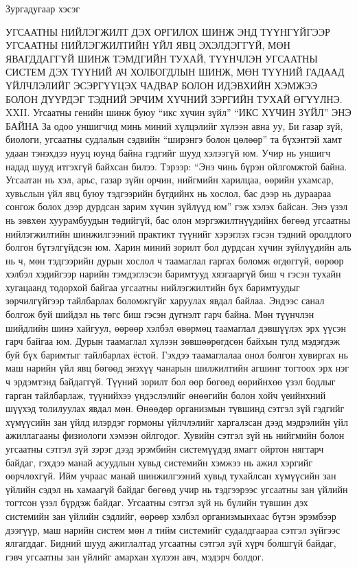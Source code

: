 Зургадугаар хэсэг

УГСААТНЫ НИЙЛЭГЖИЛТ ДЭХ ОРГИЛОХ ШИНЖ
ЭНД ТҮҮНГҮЙГЭЭР УГСААТНЫ НИЙЛЭГЖИЛТИЙН ҮЙЛ ЯВЦ ЭХЭЛДЭГГҮЙ, МӨН ЯВАГДДАГГҮЙ ШИНЖ ТЭМДГИЙН ТУХАЙ, ТҮҮНЧЛЭН УГСААТНЫ СИСТЕМ ДЭХ ТҮҮНИЙ АЧ ХОЛБОГДЛЫН ШИНЖ, МӨН ТҮҮНИЙ ГАДААД ҮЙЛЧЛЭЛИЙГ ЭСЭРГҮҮЦЭХ ЧАДВАР БОЛОН ИДЭВХИЙН ХЭМЖЭЭ БОЛОН ДҮҮРДЭГ ТЭДНИЙ ЭРЧИМ ХҮЧНИЙ ЗЭРГИЙН ТУХАЙ ӨГҮҮЛНЭ.
XXII. Угсаатны генийн шинж буюу “икс хүчин зүйл”
“ИКС ХҮЧИН ЗҮЙЛ” ЭНЭ БАЙНА
За одоо уншигчид минь миний хүлцэлийг хүлээн авна уу, Би газар зүй, биологи, угсаатны судлалын сэдвийн “ширэнгэ болон цөлөөр” та бүхэнтэй хамт удаан тэнэхдээ нууц юунд байна гэдгийг шууд хэлээгүй юм. Учир нь уншигч надад шууд итгэхгүй байхсан билээ. Тэрээр: “Энэ чинь бүрэн ойлгомжтой байна. Угсаатан нь хэл, арьс, газар зүйн орчин, нийгмийн харилцаа, өөрийн ухамсар, хувьслын үйл явц буюу тэдгээрийн бүгдийнх нь хослол, бас дээр нь дураараа сонгож болох дээр дурдсан зарим хүчин зүйлүүд юм” гэж хэлэх байсан. Энэ үзэл нь зөвхөн хуурамбуудын төдийгүй, бас олон мэргэжилтнүүдийнх бөгөөд угсаатны нийлэгжилтийн шинжилгээний практикт түүнийг хэрэглэх гэсэн тэдний оролдлого болгон бүтэлгүйдсэн юм.
Харин миний зорилт бол дурдсан хүчин зүйлүүдийн аль нь ч, мөн тэдгээрийн дурын хослол ч таамаглал гаргах боломж өгдөггүй, өөрөөр хэлбэл хэдийгээр нарийн тэмдэглэсэн баримтууд хязгааргүй биш ч гэсэн тухайн хугацаанд тодорхой байгаа угсаатны нийлэгжилтийн бүх баримтуудыг зөрчилгүйгээр тайлбарлах боломжгүйг харуулах явдал байлаа. Эндээс санал болгож буй шийдэл нь төгс биш гэсэн дүгнэлт гарч байна. Мөн түүнчлэн шийдлийн шинэ хайгуул, өөрөөр хэлбэл өвөрмөц таамаглал дэвшүүлэх эрх үүсэн гарч байгаа юм. Дурын таамаглал хүлээн зөвшөөрөгдсөн байхын тулд мэдэгдэж буй бүх баримтыг тайлбарлах ёстой. Гэхдээ таамаглалаа онол болгон хувиргах нь маш нарийн үйл явц бөгөөд энэхүү чанарын шилжилтийн агшинг тогтоох эрх нэг ч эрдэмтэнд байдаггүй. Түүний зорилт бол өөр бөгөөд өөрийнхөө үзэл бодлыг гарган тайлбарлаж, түүнийхээ үндэслэлийг өнөөгийн болон хойч үеийнхний шүүхэд толилуулах явдал мөн.
Өнөөдөр организмын түвшинд сэтгэл зүй гэдгийг хүмүүсийн зан үйлд илэрдэг гормоны үйлчлэлийг харгалзсан дээд мэдрэлийн үйл ажиллагааны физиологи хэмээн ойлгодог.
Хувийн сэтгэл зүй нь нийгмийн болон угсаатны сэтгэл зүй зэрэг дээд эрэмбийн системүүдэд ямагт ойртон нягтарч байдаг, гэхдээ манай асуудлын хувьд системийн хэмжээ нь ажил хэргийг өөрчлөхгүй. Ийм учраас манай шинжилгээний хувьд тухайлсан хүмүүсийн зан үйлийн сэдэл нь хамаагүй байдаг бөгөөд учир нь тэдгээрээс угсаатны зан үйлийн тогтсон үзэл бүрдэж байдаг.
Угсаатны сэтгэл зүй нь бүлийн түвшин дэх системийн зан үйлийн сэдлийг, өөрөөр хэлбэл организмынхаас бүтэн эрэмбээр дээгүүр, маш нарийн систем мөн л тийм системийг судалдгаараа сэтгэл зүйгээс ялгагддаг. Бидний шууд ажиглалтад угсаатны сэтгэл зүй хүрч болшгүй байдаг, гэвч угсаатны зан үйлийг амархан хүлээн авч, мэдэрч болдог.
